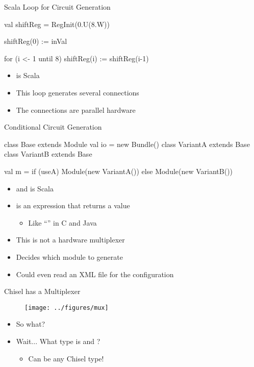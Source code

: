 \begin{frame}[fragile]{Scala  Loop for Circuit Generation}
\begin{chisel}
val shiftReg = RegInit(0.U(8.W))

shiftReg(0) := inVal

for (i <- 1 until 8) {
  shiftReg(i) := shiftReg(i-1)
}
\end{chisel}
\begin{itemize}
\item {} is Scala
\item This loop generates several connections
\item The connections are parallel hardware
\end{itemize}
\end{frame}

\begin{frame}[fragile]{Conditional Circuit Generation}
\begin{chisel}
class Base extends Module { val io = new Bundle() }
class VariantA extends Base { }
class VariantB extends Base { }

val m = if (useA) Module(new VariantA())
        else Module(new VariantB())
\end{chisel}
\begin{itemize}
\item {} and  is Scala
\item {} is an expression that returns a value
\begin{itemize}
\item Like ``'' in C and Java
\end{itemize}
\item This is not a hardware multiplexer
\item Decides which module to generate
\item Could even read an XML file for the configuration
\end{itemize}
\end{frame}

\begin{frame}[fragile]{Chisel has a Multiplexer}
\begin{figure}
  \texttt{[image: ../figures/mux]}
\end{figure}
\begin{itemize}
\item So what?
\item Wait... What type is  and ?
\begin{itemize}
\item Can be any Chisel type!
\end{itemize}
\end{itemize}
\end{frame}

